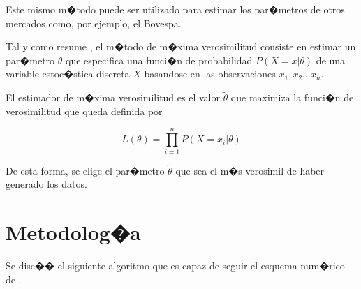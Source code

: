 \documentclass[12pt,a4paper,spanish]{article}%
\begin{document}
Este mismo m�todo puede ser utilizado para estimar los par�metros de otros mercados como, por ejemplo, el Bovespa.

Tal y como resume \cite{MIURA2011}, el m�todo de m�xima verosimilitud consiste en estimar un par�metro $\theta$ que especifica una funci�n de probabilidad $P(X=x|\theta)$ de una variable estoc�stica discreta $X$ basandose en las observaciones $x_1, x_2 \dots x_n$.

El estimador de m�xima verosimilitud es el valor $\tilde{\theta}$ que maximiza la funci�n de verosimilitud que queda definida por

\begin{equation}
	L(\theta) = \prod_{i=1}^{n}P(X=x_i|\theta)
	\label{verosimilitud}
\end{equation}

De esta forma, se elige el par�metro $\tilde{\theta}$ que sea el m�s verosimil de haber generado los datos.





\section {Metodolog�a}\label{sec:metodo} %

Se dise�� el siguiente algoritmo que es capaz de seguir el esquema num�rico de \cite{Cartea2019}.
\end{document}
